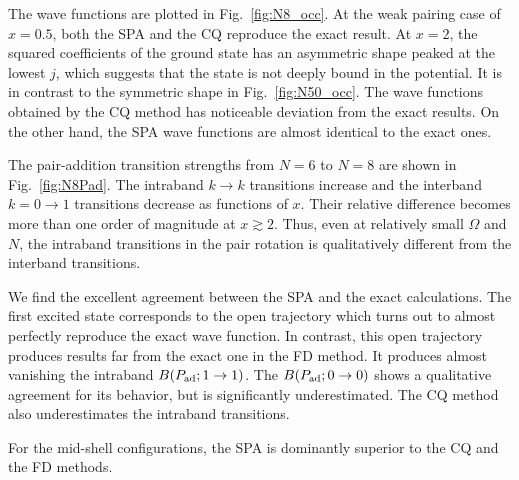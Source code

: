 \documentclass[11pt]{book} %
\begin{document}
The wave functions are plotted in Fig.~\ref{fig:N8_occ}. 
At the weak pairing case of $x=0.5$,
both the SPA and the CQ reproduce the exact result.
At $x=2$, the squared coefficients of the ground state has an
asymmetric shape peaked at the
lowest $j$, which suggests that the state is not deeply bound in the
potential.
It is in contrast to the symmetric shape in Fig.~\ref{fig:N50_occ}.
The wave functions obtained by the CQ method has noticeable deviation
from the exact results.
On the other hand, the SPA wave functions are almost identical to the
exact ones.

The pair-addition transition strengths from $N=6$ to $N=8$ are
shown in Fig.~\ref{fig:N8Pad}.
The intraband $k\rightarrow k$ transitions increase and 
the interband $k=0\rightarrow 1$ transitions decrease as
functions of $x$.
Their relative difference becomes
more than one order of magnitude at $x\gtrsim 2$.
Thus, even at relatively small $\Omega$ and $N$,
the intraband transitions in the pair rotation is qualitatively different
from the interband transitions.

We find the excellent agreement between the SPA and the exact calculations.
The first excited state corresponds to the open trajectory which
turns out to almost perfectly reproduce the exact wave function.
In contrast, this open trajectory produces results far from the exact
one in the FD method.
It produces almost vanishing the intraband
$B(P_{\rm ad}; 1\rightarrow 1)$.
The $B(P_{\rm ad}; 0\rightarrow 0)$ shows a qualitative agreement for
its behavior, but is significantly underestimated.
The CQ method also underestimates the intraband transitions.

For the mid-shell configurations, the SPA is dominantly superior to the
CQ and the FD methods.
\end{document}

